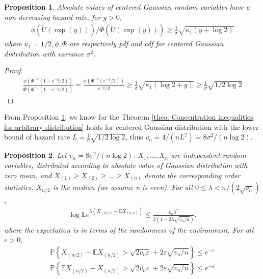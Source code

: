 \documentclass{article}
\theoremstyle{plain}
\newtheorem{prop}{Proposition}
\begin{document}
\begin{prop}
\label{prop: hazard bound for normal}
Absolute values of centered Gaussian random variables have a non-decreasing
hazard rate, for $y>0$,
\begin{align}
    \phi(\tilde{U}(\exp (y))) / \overline{\Phi}(\tilde{U}(\exp (y))) \geq \frac{1}{\sigma} \sqrt{\kappa_{1}(y+\log 2)}
\end{align}
 where $\kappa_{1} = 1 / 2, \phi, \Phi$ are respectively pdf and cdf for centered Gaussian distribution with variance $\sigma^2$. 
\end{prop}

\begin{proof}
\begin{align}
    \frac{\phi\left(\Phi^{-1}\left(1-e^{-y} / 2\right)\right)}{\overline{\Phi}\left(\Phi^{-1}\left(1-e^{-y} / 2\right)\right)}=\frac{\phi\left(\Phi^{-1}\left(e^{-y} / 2\right)\right)}{e^{-y} / 2} \geq \frac{1}{\sigma} \sqrt{\kappa_{1}(\log 2+y)} \geq \frac{1}{\sigma} \sqrt{1/2\log 2}
\end{align}
\end{proof}

From Proposition \ref{prop: hazard bound for normal}, we know for the Theorem \ref{theo: Concentration inequalities for arbitrary distribution} holds for centered Gaussian distribution with the lower bound of hazard rate $L = \frac{1}{\sigma} \sqrt{1/2\log 2}$, thus $v_n = 4/(nL^2) =  8 \sigma^2/(n \log 2)$.

\iffalse
\begin{prop}
\label{prop 4.6}
Let $v_{n}=8 \sigma^2 /(n \log 2)$. $X_1, ..., X_n$ are independent random variables, distributed according to absolute value of Gaussian distribution with zero mean, and $X_{(1)} \geq X_{(2)} \geq ... \geq X_{(n)}$ denote the corresponding order statistics. $X_{n/2}$ is the median (we assume n is even). For all $0 \leq \lambda<n /\left(2 \sqrt{v_{n}}\right)$, 
\begin{align}
    \label{inequality Bernstein with log for normal}
    \log \mathbb{E}e^{\lambda\left(X_{(n / 2)}-\mathbb{E} X_{(n / 2)}\right)} \leq \frac{v_{n} \lambda^{2}}{2\left(1-2 \lambda \sqrt{v_{n} / n}\right)}.
\end{align}
where the expectation is in terms of the randomness of the environment. For all $\varepsilon > 0$,
\begin{align} 
    \label{inequality Bernstein upper bound for normal}
    \mathbb{P}\left\{X_{(n / 2)}-\mathbb{E} X_{(n / 2)}>\sqrt{2 v_{n} \varepsilon}+2 \varepsilon \sqrt{v_{n} / n}\right\} \leq e^{-\varepsilon}\\
    \label{inequality Bernstein lower bound for normal}
    \mathbb{P}\left\{\mathbb{E} X_{(n / 2)} - X_{(n / 2)}>\sqrt{2 v_{n} \varepsilon}+2 \varepsilon \sqrt{v_{n} / n}\right\} \leq e^{-\varepsilon}
\end{align}
\end{prop}
\end{document}
